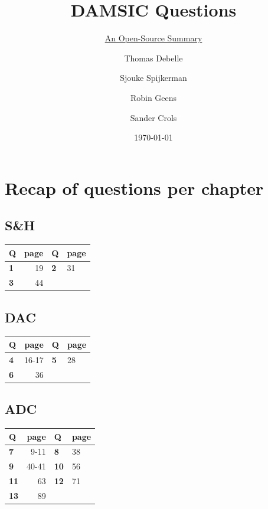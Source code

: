 \documentclass[
  a4paper,
]{article}
\title{DAMSIC Questions}
\subtitle{\href{https://github.com/Tfloow/ESATSummary}{An Open-Source
Summary}}
\author{Thomas Debelle \and Sjouke Spijkerman \and Robin
Geens \and Sander Crols}
\date{\today}
\begin{document}
\maketitle

{
\setcounter{tocdepth}{3}
\tableofcontents
}
\hypertarget{recap-of-questions-per-chapter}{%
\section{Recap of questions per
chapter}\label{recap-of-questions-per-chapter}}

\hypertarget{sh}{%
\subsection{S\&H}\label{sh}}

\begin{longtable}[]{@{}lrll@{}}
\toprule\noalign{}
Q & page & Q & page \\
\midrule\noalign{}
\endhead
\bottomrule\noalign{}
\endlastfoot
\textbf{1} & 19 & \textbf{2} & 31 \\
\textbf{3} & 44 & & \\
\end{longtable}

\hypertarget{dac}{%
\subsection{DAC}\label{dac}}

\begin{longtable}[]{@{}lrll@{}}
\toprule\noalign{}
Q & page & Q & page \\
\midrule\noalign{}
\endhead
\bottomrule\noalign{}
\endlastfoot
\textbf{4} & 16-17 & \textbf{5} & 28 \\
\textbf{6} & 36 & & \\
\end{longtable}

\hypertarget{adc}{%
\subsection{ADC}\label{adc}}

\begin{longtable}[]{@{}lrll@{}}
\toprule\noalign{}
Q & page & Q & page \\
\midrule\noalign{}
\endhead
\bottomrule\noalign{}
\endlastfoot
\textbf{7} & 9-11 & \textbf{8} & 38 \\
\textbf{9} & 40-41 & \textbf{10} & 56 \\
\textbf{11} & 63 & \textbf{12} & 71 \\
\textbf{13} & 89 & & \\
\end{longtable}
\end{document}
